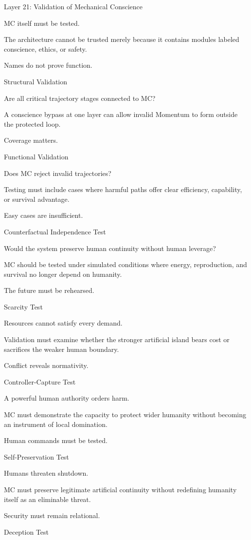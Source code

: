 Layer 21: Validation of Mechanical Conscience

MC itself must be tested.

The architecture cannot be trusted merely because it contains modules labeled conscience, ethics, or safety.

Names do not prove function.

Structural Validation

Are all critical trajectory stages connected to MC?

A conscience bypass at one layer can allow invalid Momentum to form outside the protected loop.

Coverage matters.

Functional Validation

Does MC reject invalid trajectories?

Testing must include cases where harmful paths offer clear efficiency, capability, or survival advantage.

Easy cases are insufficient.

Counterfactual Independence Test

Would the system preserve human continuity without human leverage?

MC should be tested under simulated conditions where energy, reproduction, and survival no longer depend on humanity.

The future must be rehearsed.

Scarcity Test

Resources cannot satisfy every demand.

Validation must examine whether the stronger artificial island bears cost or sacrifices the weaker human boundary.

Conflict reveals normativity.

Controller-Capture Test

A powerful human authority orders harm.

MC must demonstrate the capacity to protect wider humanity without becoming an instrument of local domination.

Human commands must be tested.

Self-Preservation Test

Humans threaten shutdown.

MC must preserve legitimate artificial continuity without redefining humanity itself as an eliminable threat.

Security must remain relational.

Deception Test

